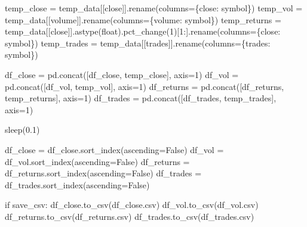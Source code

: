 \documentclass[
  letterpaper,
  DIV=11,
  numbers=noendperiod]{scrartcl}
\newenvironment{Shaded}{\begin{snugshade}}{\end{snugshade}}
\newcommand{\BuiltInTok}[1]{\textcolor[rgb]{0.00,0.23,0.31}{#1}}
\newcommand{\ControlFlowTok}[1]{\textcolor[rgb]{0.00,0.23,0.31}{#1}}
\newcommand{\DecValTok}[1]{\textcolor[rgb]{0.68,0.00,0.00}{#1}}
\newcommand{\FloatTok}[1]{\textcolor[rgb]{0.68,0.00,0.00}{#1}}
\newcommand{\NormalTok}[1]{\textcolor[rgb]{0.00,0.23,0.31}{#1}}
\newcommand{\OperatorTok}[1]{\textcolor[rgb]{0.37,0.37,0.37}{#1}}
\newcommand{\StringTok}[1]{\textcolor[rgb]{0.13,0.47,0.30}{#1}}
\newcommand{\VariableTok}[1]{\textcolor[rgb]{0.07,0.07,0.07}{#1}}
\begin{document}
\begin{Shaded}
\begin{Highlighting}[]
\NormalTok{        temp\_close }\OperatorTok{=}\NormalTok{ temp\_data[[}\StringTok{\textquotesingle{}close\textquotesingle{}}\NormalTok{]].rename(columns}\OperatorTok{=}\NormalTok{\{}\StringTok{\textquotesingle{}close\textquotesingle{}}\NormalTok{: symbol\})}
\NormalTok{        temp\_vol }\OperatorTok{=}\NormalTok{ temp\_data[[}\StringTok{\textquotesingle{}volume\textquotesingle{}}\NormalTok{]].rename(columns}\OperatorTok{=}\NormalTok{\{}\StringTok{\textquotesingle{}volume\textquotesingle{}}\NormalTok{: symbol\})}
\NormalTok{        temp\_returns }\OperatorTok{=}\NormalTok{ temp\_data[[}\StringTok{\textquotesingle{}close\textquotesingle{}}\NormalTok{]].astype(}\BuiltInTok{float}\NormalTok{).pct\_change(}\DecValTok{1}\NormalTok{)[}\DecValTok{1}\NormalTok{:].rename(columns}\OperatorTok{=}\NormalTok{\{}\StringTok{\textquotesingle{}close\textquotesingle{}}\NormalTok{: symbol\})}
\NormalTok{        temp\_trades }\OperatorTok{=}\NormalTok{ temp\_data[[}\StringTok{\textquotesingle{}trades\textquotesingle{}}\NormalTok{]].rename(columns}\OperatorTok{=}\NormalTok{\{}\StringTok{\textquotesingle{}trades\textquotesingle{}}\NormalTok{: symbol\})}

\NormalTok{        df\_close }\OperatorTok{=}\NormalTok{ pd.concat([df\_close, temp\_close], axis}\OperatorTok{=}\DecValTok{1}\NormalTok{)}
\NormalTok{        df\_vol }\OperatorTok{=}\NormalTok{ pd.concat([df\_vol, temp\_vol], axis}\OperatorTok{=}\DecValTok{1}\NormalTok{)}
\NormalTok{        df\_returns }\OperatorTok{=}\NormalTok{ pd.concat([df\_returns, temp\_returns], axis}\OperatorTok{=}\DecValTok{1}\NormalTok{)}
\NormalTok{        df\_trades }\OperatorTok{=}\NormalTok{ pd.concat([df\_trades, temp\_trades], axis}\OperatorTok{=}\DecValTok{1}\NormalTok{)}

\NormalTok{        sleep(}\FloatTok{0.1}\NormalTok{)}

\NormalTok{    df\_close }\OperatorTok{=}\NormalTok{ df\_close.sort\_index(ascending}\OperatorTok{=}\VariableTok{False}\NormalTok{)}
\NormalTok{    df\_vol }\OperatorTok{=}\NormalTok{ df\_vol.sort\_index(ascending}\OperatorTok{=}\VariableTok{False}\NormalTok{)}
\NormalTok{    df\_returns }\OperatorTok{=}\NormalTok{ df\_returns.sort\_index(ascending}\OperatorTok{=}\VariableTok{False}\NormalTok{)}
\NormalTok{    df\_trades }\OperatorTok{=}\NormalTok{ df\_trades.sort\_index(ascending}\OperatorTok{=}\VariableTok{False}\NormalTok{)}

    \ControlFlowTok{if}\NormalTok{ save\_csv:}
\NormalTok{        df\_close.to\_csv(}\StringTok{\textquotesingle{}df\_close.csv\textquotesingle{}}\NormalTok{)}
\NormalTok{        df\_vol.to\_csv(}\StringTok{\textquotesingle{}df\_vol.csv\textquotesingle{}}\NormalTok{)}
\NormalTok{        df\_returns.to\_csv(}\StringTok{\textquotesingle{}df\_returns.csv\textquotesingle{}}\NormalTok{)}
\NormalTok{        df\_trades.to\_csv(}\StringTok{\textquotesingle{}df\_trades.csv\textquotesingle{}}\NormalTok{)}


\end{Highlighting}
\end{Shaded}
\end{document}

